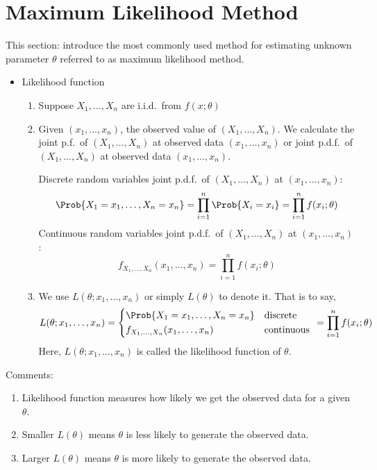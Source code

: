 \section{Maximum Likelihood Method}
This section: introduce the most commonly used method for estimating unknown
parameter $ \theta $ referred to as maximum likelihood method.
\begin{itemize}
    \item Likelihood function
          \begin{enumerate}
              \item Suppose $ X_1,\ldots,X_n $ are i.i.d.\ from $ f(x;\theta) $
              \item Given $ (x_1,\ldots,x_n) $, the observed value of $ (X_1,\ldots,X_n) $.
                    We calculate the joint p.f.\ of $ (X_1,\ldots,X_n) $ at observed
                    data $ (x_1,\ldots,x_n) $ or joint p.d.f.\ of $ (X_1,\ldots,X_n) $
                    at observed data $ (x_1,\ldots,x_n) $.

                    Discrete random variables joint p.d.f.\ of $ (X_1,\ldots,X_n) $
                    at $ (x_1,\ldots,x_n) $:
                    \[ \Prob{X_1=x_1,\ldots,X_n=x_n}=
                        \prod_{i=1}^n \Prob{X_i=x_i}=
                        \prod_{i=1}^n f(x_i;\theta) \]
                    Continuous random variables joint p.d.f.\ of $ (X_1,\ldots,X_n) $
                    at $ (x_1,\ldots,x_n) $:
                    \[ f_{X_1,\ldots,X_n}(x_1,\ldots,x_n)=
                        \prod_{i=1}^n f(x_i;\theta) \]
              \item We use $ L(\theta;x_1,\ldots,x_n) $ or simply
                    $ L(\theta) $ to denote it. That is to say,
                    \[ L(\theta;x_1,\ldots,x_n)=
                        \begin{cases*}
                            \Prob{X_1=x_1,\ldots,X_n=x_n}      & discrete   \\
                            f_{X_1,\ldots,X_n}(x_1,\ldots,x_n) & continuous
                        \end{cases*}=\prod_{i=1}^n f(x_i;\theta) \]
                    Here, $ L(\theta;x_1,\ldots,x_n) $ is called the likelihood function
                    of $ \theta $.
          \end{enumerate}
\end{itemize}
Comments:
\begin{enumerate}
    \item Likelihood function measures how likely we get
          the observed data for a given $ \theta $.
    \item Smaller $ L(\theta) $ means $ \theta $ is less likely
          to generate the observed data.
    \item Larger $ L(\theta) $ means $ \theta $ is more likely
          to generate the observed data.
\end{enumerate}
